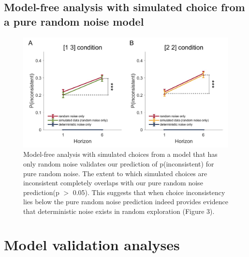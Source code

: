 \documentclass[12pt]{article}
\begin{document}
	\subsection{Model-free analysis with simulated choice from a pure random noise model}
	\begin{figure}[H]
	\begin{center}
		\includegraphics[width=\textwidth]{figures/RDBayes_pinconsistent_validation.jpg}
		\caption{Model-free analysis with simulated choices from a model that has only random noise validates our prediction of p(inconsistent) for pure random noise. The extent to which simulated choices are inconsistent completely overlaps with our pure random noise prediction(p $>$ 0.05). This suggests that when choice inconsistency lies below the pure random noise prediction indeed provides evidence that deterministic noise exists in random exploration (Figure 3).}
		\label{fig:s3}
	\end{center}
	\end{figure}
	\newpage
	\section{Model validation analyses}
	
\end{document}
